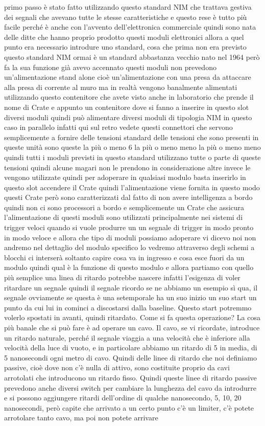 {primo passo è stato fatto utilizzando questo standard NIM che trattava gestiva dei segnali che avevano tutte le stesse caratteristiche e questo rese è tutto più facile perché è anche con l'avvento dell'elettronica commerciale quindi sono nata delle ditte che hanno proprio prodotto questi moduli elettronici allora a quel punto era necessario introdure uno standard, cosa che prima non era previsto questo standard NIM ormai è un standard abbastanza vecchio nato nel 1964 però fa la sua funzione già avevo accennato questi moduli non prevedono un'alimentazione stand alone cioè un'alimentazione con una presa da attaccare alla presa di corrente al muro ma in realtà vengono banalmente alimentati utilizzando questo contenitore che avete visto anche in laboratorio che prende il nome di Crate e appunto un contenitore dove si fanno a inserire in questo slot diversi moduli quindi può alimentare diversi moduli di tipologia NIM in questo caso in parallelo infatti qui sul retro vedete questi connettori che servono semplicemente a fornire delle tensioni standard delle tensioni che sono presenti in queste unità sono queste la più o meno 6 la più o meno meno la più o meno meno quindi tutti i moduli previsti in questo standard utilizzano tutte o parte di queste tensioni quindi alcune magari non le prendono in considerazione altre invece le vengono utilizzate quindi per adoperare in qualsiasi modulo basta inserirlo in questo slot accendere il Crate quindi l'alimentazione viene fornita in questo modo questi Crate però sono caratterizzati dal fatto di non avere intelligenza a bordo quindi non ci sono processori a bordo e semplicemente un Crate che assicura l'alimentazione di questi moduli sono utilizzati principalmente nei sistemi di trigger veloci quando si vuole produrre un un segnale di trigger in modo pronto in modo veloce e allora che tipo di moduli possiamo adoperare vi dicevo noi non andremo nel dettaglio del modulo specifico lo vedremo attraverso degli schemi a blocchi ci interserà soltanto capire cosa va in ingresso e cosa esce fuori da un modulo quindi qual è la funzione di questo modulo e allora partiamo con quello più semplice una linea di ritardo potrebbe nascere infatti l'esigenza di voler ritardare un segnale quindi il segnale ricordo se ne abbiamo un esempio sì qua, il segnale ovviamente se questa è una setemporale ha un suo inizio un suo start un punto da cui lui in cominci a discostarsi dalla baseline. Questo start potremmo volerlo spostati in avanti, quindi ritardato. Come si fa questa operazione? La cosa più banale che si può fare è ad operare un cavo. Il cavo, se vi ricordate, introduce un ritardo naturale, perché il segnale viaggia a una velocità che è inferiore alla velocità della luce di vuoto, e in particolare abbiamo un ritardo di 5 in media, di 5 nanosecondi ogni metro di cavo. Quindi delle linee di ritardo che noi definiamo passive, cioè dove non c'è nulla di attivo, sono costituite proprio da cavi arrotolati che introducono un ritardo fisso. Quindi queste linee di ritardo passive prevedono anche diversi switch per cambiare la lunghezza del cavo da introdurre e si possono aggiungere ritardi dell'ordine di qualche nanosecondo, 5, 10, 20 nanosecondi, però capite che arrivato a un certo punto c'è un limiter, c'è potete arrotolare tanto cavo, ma poi non potete arrivare }

